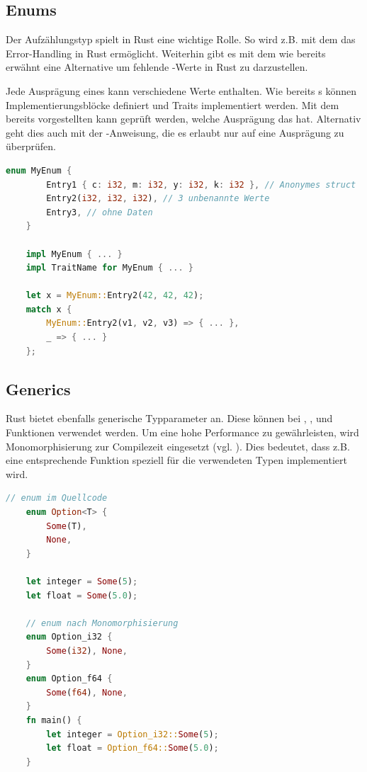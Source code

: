 \documentclass[11pt,a4paper, ngerman]{article}
\begin{document}
\subsection{Enums}
Der Aufzählungstyp  spielt in Rust eine wichtige Rolle. So wird z.B. mit dem   das Error-Handling in Rust ermöglicht. Weiterhin gibt es mit dem   wie bereits erwähnt eine Alternative um fehlende -Werte in Rust zu darzustellen.

Jede Ausprägung eines  kann verschiedene Werte enthalten. Wie bereits s können Implementierungsblöcke definiert und Traits implementiert werden. Mit dem bereits vorgestellten  kann geprüft werden, welche Ausprägung das  hat. Alternativ geht dies auch mit der -Anweisung, die es erlaubt nur auf eine Ausprägung zu überprüfen.

\begin{lstlisting}[language=rust, caption={enum}]
    enum MyEnum {
        Entry1 { c: i32, m: i32, y: i32, k: i32 }, // Anonymes struct
        Entry2(i32, i32, i32), // 3 unbenannte Werte
        Entry3, // ohne Daten
    }

    impl MyEnum { ... }
    impl TraitName for MyEnum { ... }

    let x = MyEnum::Entry2(42, 42, 42);
    match x {
        MyEnum::Entry2(v1, v2, v3) => { ... },
        _ => { ... }
    };
\end{lstlisting}

\subsection{Generics}
Rust bietet ebenfalls generische Typparameter an. Diese können bei , ,  und Funktionen verwendet werden. Um eine hohe Performance zu gewährleisten, wird Monomorphisierung zur Compilezeit eingesetzt (vgl. \cite[S. 196 ff.]{SK19}). Dies bedeutet, dass z.B. eine entsprechende Funktion speziell für die verwendeten Typen implementiert wird.

\begin{lstlisting}[language=rust, caption={Monomorphisierung Veranschaulichung \cite{MonoCodeEx}}]
    // enum im Quellcode
    enum Option<T> {
        Some(T),
        None,
    }

    let integer = Some(5);
    let float = Some(5.0);
    
    // enum nach Monomorphisierung
    enum Option_i32 {
        Some(i32), None,
    }
    enum Option_f64 {
        Some(f64), None,
    }
    fn main() {
        let integer = Option_i32::Some(5);
        let float = Option_f64::Some(5.0);
    }
\end{lstlisting}
\end{document}
